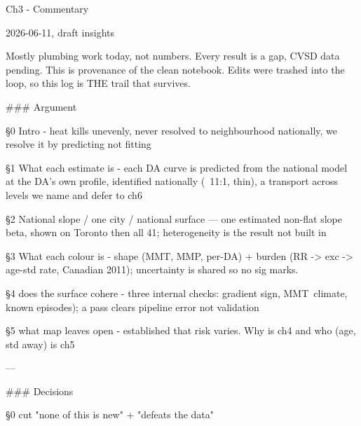 Ch3 - Commentary

2026-06-11, draft insights

Mostly plumbing work today, not numbers. Every result is a gap, CVSD data pending. This is provenance of the clean notebook. Edits were trashed into the loop, so this log is THE trail that survives.

### Argument

§0 Intro - heat kills unevenly, never resolved to neighbourhood nationally, we resolve it by predicting not fitting

§1 What each estimate is - each DA curve is predicted from the national model at the DA's own profile, identified nationally (~11:1, thin), a transport across levels we name and defer to ch6

§2 National slope / one city / national surface — one estimated non-flat slope beta, shown on Toronto then all 41; heterogeneity is the result not built in

§3 What each colour is - shape (MMT, MMP, per-DA) + burden (RR -> exc -> age-std rate, Canadian 2011); uncertainty is shared so no sig marks.

§4 does the surface cohere - three internal checks: gradient sign, MMT~climate, known episodes); a pass clears pipeline error not validation

§5 what map leaves open - established that risk varies. Why is ch4 and who (age, std away) is ch5

---

### Decisions 

§0 cut "none of this is new" + "defeats the data" 